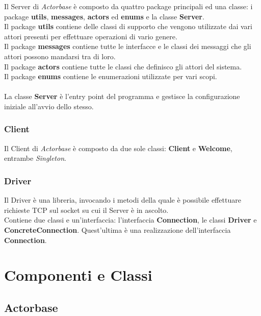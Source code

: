 \documentclass[a4paper]{article}
\begin{document}
        	Il Server di \emph{Actorbase} è composto da quattro package principali ed una classe: 
			i package \textbf{utils}, \textbf{messages}, \textbf{actors} ed \textbf{enums} e la classe \textbf{Server}. \\
			
			Il package \textbf{utils} contiene delle classi di supporto che vengono utilizzate dai vari attori presenti per effettuare operazioni 
			di vario genere. \\
			Il package \textbf{messages} contiene tutte le interfacce e le classi dei messaggi che gli attori possono mandarsi tra di loro. \\
			Il package \textbf{actors} contiene tutte le classi che definisco gli attori del sistema. \\
			Il package \textbf{enums} contiene le enumerazioni utilizzate per vari scopi. \\
			\\
			\noindent La classe \textbf{Server} è l'entry point del programma e gestisce la configurazione iniziale all'avvio dello stesso.  
			            
		
        \subsubsection{Client}
		
        	Il Client di \emph{Actorbase} è composto da due sole classi: \textbf{Client} e \textbf{Welcome}, entrambe \emph{Singleton}.

        \subsubsection{Driver}
		
        	Il Driver è una libreria, invocando i metodi della quale è possibile effettuare richieste TCP sul socket su cui il
			Server è in ascolto. \\
			Contiene due classi e un'interfaccia: l'interfaccia \textbf{Connection}, le classi \textbf{Driver} e \textbf{ConcreteConnection}. 
			Quest'ultima è una realizzazione dell'interfaccia \textbf{Connection}. 

				
	\newpage 
	\section{Componenti e Classi}
	
		\subsection{Actorbase}
			
\end{document}
